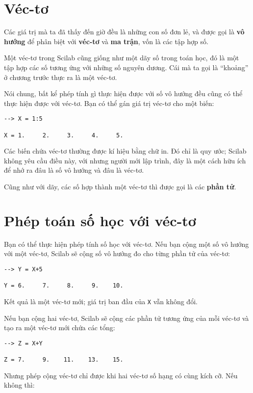 \documentclass[12pt]{book}
\begin{document}
\section{Véc-tơ}

Các giá trị mà ta đã thấy đến giờ đều là những con số đơn lẻ,
và được gọi là {\bf vô hướng} để phân biệt với {\bf véc-tơ}
và {\bf ma trận}, vốn là các tập hợp số.

Một véc-tơ trong Scilab cũng giống như một dãy số trong
toán học, đó là một tập hợp các số tương ứng với những số
nguyên dương. Cái mà ta gọi là ``khoảng'' ở chương trước
thực ra là một véc-tơ.

Nói chung, bất kể phép tính gì thực hiện được với số vô hướng
đều cũng có thể thực hiện được với véc-tơ. Bạn có thể gán
giá trị véc-tơ cho một biến:

\begin{verbatim}
--> X = 1:5

X = 1.     2.     3.     4.     5.
\end{verbatim}
%
Các biến chứa véc-tơ thường được kí hiệu bằng chữ in. Đó 
chỉ là quy ước; Scilab không yêu cầu điều này, với nhưng người
mới lập trình, đây là một cách hữu ích để nhớ ra đâu là số vô hướng
và đâu là véc-tơ.

Cũng như với dãy, các số hợp thành một véc-tơ thì được gọi là các
{\bf phần tử}.


\section{Phép toán số học với véc-tơ}

Bạn có thể thực hiện phép tính số học với véc-tơ. Nếu bạn cộng
một số vô hướng với một véc-tơ, Scilab sẽ cộng số vô hướng
đo cho từng phần tử của véc-tơ:

\begin{verbatim}
--> Y = X+5

Y = 6.     7.     8.     9.    10.
\end{verbatim}
%
Kết quả là một véc-tơ mới; giá trị ban đầu của {\tt X} vẫn
không đổi.

Nếu bạn cộng hai véc-tơ, Scilab sẽ cộng các phần tử tương ứng
của mỗi véc-tơ và tạo ra một véc-tơ mới chứa các tổng:

\begin{verbatim}
--> Z = X+Y

Z = 7.     9.    11.    13.    15.
\end{verbatim}
%
Nhưng phép cộng véc-tơ chỉ được khi hai véc-tơ số hạng có cùng
kích cỡ. Nếu không thì:
\end{document}
